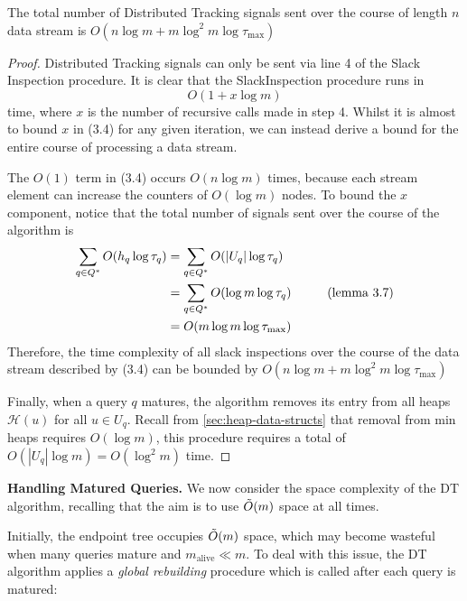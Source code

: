 \begin{lemma}
    The total number of Distributed Tracking signals sent over the course of length $n$ data stream is $O(n\log m +m\log^2m\log\tau_{\max})$
\end{lemma}
\begin{proof}
    Distributed Tracking signals can only be sent via line 4 of the Slack Inspection procedure. It is clear that the SlackInspection procedure runs in 
\begin{equation}
    O(1 + x\log m)
\end{equation}
time, where $x$ is the number of recursive calls made in step 4. Whilst it is almost to bound $x$ in (3.4) for any given iteration, we can instead derive a bound for the entire course of processing a data stream. 

The $O(1)$ term in (3.4) occurs $O(n\log m)$ times, because each stream element can increase the counters of $O(\log m)$ nodes. To bound the $x$ component, notice that the total number of signals sent over the course of the algorithm is 
\begin{align*}
  \sum_{q\in Q^*}O(h_q \log \tau_q) &= \sum_{q\in Q^*} O(|U_q|\log\tau_q) \\
  &= \sum_{q\in Q^*} O(\log m\log\tau_q) \hspace{10mm} \text{(lemma 3.7)} \\
  &= O(m\log m\log\tau_{\max})
\end{align*}
Therefore, the time complexity of all slack inspections over the course of the data stream described by (3.4) can be bounded by $O(n\log m + m\log^2m\log\tau_{\max})$

Finally, when a query $q$ matures, the algorithm removes its entry from all heaps $\mathcal{H}(u)$ for all $u\in U_q$. Recall from \cref{sec:heap-data-structs} that removal from min heaps requires $O(\log m)$, this procedure requires a total of $O(|U_q| \log m) = O(\log^2m)$ time. 
\end{proof}

\textbf{Handling Matured Queries.} We now consider the space complexity of the DT algorithm, recalling that the aim is to use $\Tilde{O}(m)$ space at all times. 

Initially, the endpoint tree occupies $\Tilde{O}(m)$ space, which may become wasteful when many queries mature and $m_{\text{alive}}\ll m$. To deal with this issue, the DT algorithm applies a \textit{global rebuilding} procedure which is called after each query is matured: 

